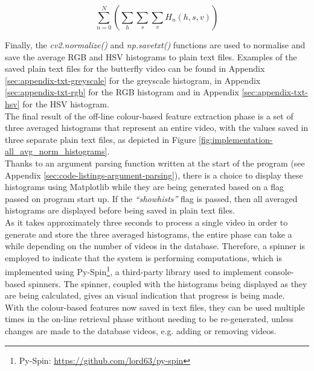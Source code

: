\begin{equation}
\label{eq:average-hsv-histogram}
    \sum_{n=0}^{N}(\sum_h \sum_s \sum_v H_n(h,s,v))
\end{equation}

Finally, the \textit{cv2.normalize()} and \textit{np.savetxt()} functions are used to normalise and save the average RGB and HSV histograms to plain text files. Examples of the saved plain text files for the butterfly video can be found in Appendix \ref{sec:appendix-txt-greyscale} for the greyscale histogram, in Appendix \ref{sec:appendix-txt-rgb} for the RGB histogram and in Appendix \ref{sec:appendix-txt-hsv} for the HSV histogram.\\

The final result of the off-line colour-based feature extraction phase is a set of three averaged histograms that represent an entire video, with the values saved in three separate plain text files, as depicted in Figure \ref{fig:implementation-all_avg_norm_histograms}.\\

Thanks to an argument parsing function written at the start of the program (see Appendix \ref{sec:code-listings-argument-parsing}), there is a choice to display these histograms using Matplotlib while they are being generated based on a flag passed on program start up. If the \textit{``showhists''} flag is passed, then all averaged histograms are displayed before being saved in plain text files.\\

As it takes approximately three seconds to process a single video in order to generate and store the three averaged histograms, the entire phase can take a while depending on the number of videos in the database. Therefore, a spinner is employed to indicate that the system is performing computations, which is implemented using Py-Spin\footnote{Py-Spin: \url{https://github.com/lord63/py-spin}}, a third-party library used to implement console-based spinners. The spinner, coupled with the histograms being displayed as they are being calculated, gives an visual indication that progress is being made.\\

With the colour-based features now saved in text files, they can be used multiple times in the on-line retrieval phase without needing to be re-generated, unless changes are made to the database videos, e.g. adding or removing videos.

